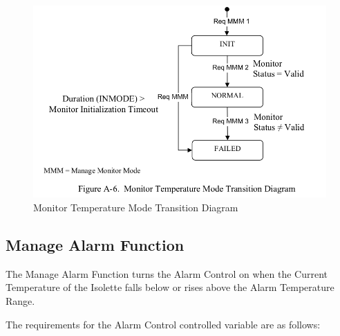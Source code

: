 \begin{figure}[ht]
  \centerline{\includegraphics[width=\textwidth]{figures/monitor-temperature-mode-transition.png}}
  \vspace{-.4cm}
  \caption{Monitor Temperature Mode Transition Diagram}
  \vspace{-.4cm}
 \label{fig:MTMT}
\end{figure}

\subsection{Manage Alarm Function}
\label{subsec:manage-alarm-function}

The Manage Alarm Function turns the Alarm Control on when the Current Temperature of the
Isolette falls below or rises above the Alarm Temperature Range.

The requirements for the Alarm Control controlled variable are as follows:

